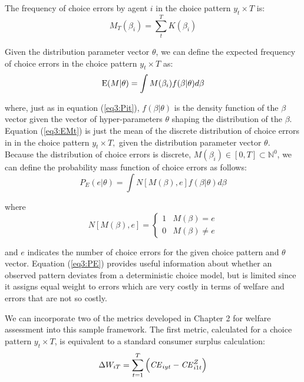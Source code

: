 \documentclass[../main.tex]{subfiles}
\begin{document}
\noindent The frequency of choice errors by agent $i$ in the choice pattern $y_t \times T$ is:
\begin{equation}
	\label{eq3:MTBn}
	M_T(\beta_i) = \sum_t^T K(\beta_i)
\end{equation}

\noindent Given the distribution parameter vector $\theta$, we can define the expected frequency of choice errors in the choice pattern $y_t \times T$ as:
\begin{equation}
	\label{eq3:EMt}
	\operatorname{E}(M | \theta) = \int M(\beta_i) f(\beta | \theta) d\beta
\end{equation}

\noindent where, just as in equation (\ref{eq3:Pit}), $f(\beta|\theta)$ is the density function of the $\beta$ vector given the vector of hyper-parameters $\theta$ shaping the distribution of the $\beta$.
Equation (\ref{eq3:EMt}) is just the mean of the discrete distribution of choice errors in in the choice pattern $y_t \times T,$ given the distribution parameter vector $\theta$.
Because the distribution of choice errors is discrete, $M(\beta_i) \in [0,T] \subset \mathbb{N}^0$, we can define the probability mass function of choice errors as follows{\footnotemark}:
\begin{equation}
	\label{eq3:PE}
	P_E(e | \theta) = \int N[M(\beta),e] f(\beta|\theta) d \beta
\end{equation}

\addtocounter{footnote}{-1}

\noindent where
\begin{equation}
	\label{eq3:NMB}
	N[M(\beta), e] =
	\begin{cases}
		1 & M(\beta) = e\\
		0 & M(\beta) \neq e
	\end{cases}
\end{equation}

\noindent and $e$ indicates the number of choice errors for the given choice pattern and $\theta$ vector.
Equation (\ref{eq3:PE}) provides useful information about whether an observed pattern deviates from a deterministic choice model, but is limited since it assigns equal weight to errors which are very costly in terms of welfare and errors that are not so costly.

We can incorporate two of the metrics developed in Chapter 2 for welfare assessment into this sample framework.
The first metric, calculated for a choice pattern $y_t \times T$, is equivalent to a standard consumer surplus calculation:
\begin{equation}
	\label{eq3:WST}
	\Delta W_{iT} = \sum_{t=1}^T \left( {\mathit{CE}}_{iyt} - {\mathit{CE}}_{i1t}^Z \right)
\end{equation}
\end{document}
